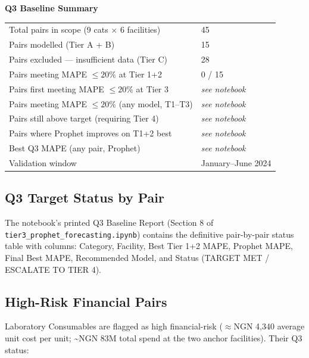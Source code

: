 \documentclass[12pt, a4paper]{article}
\begin{document}
\vspace{0.5em}

\begin{mdframed}[style=keybox]
\textbf{Q3 Baseline Summary}

\vspace{0.4em}
\begin{tabular}{@{}ll}
  Total pairs in scope (9 cats $\times$ 6 facilities)     & 45 \\
  Pairs modelled (Tier A + B)                              & 15 \\
  Pairs excluded --- insufficient data (Tier C)            & 28 \\[0.3em]
  Pairs meeting MAPE $\leq 20\%$ at Tier 1+2              & 0 / 15 \\
  Pairs first meeting MAPE $\leq 20\%$ at Tier 3          & \textit{see notebook} \\
  Pairs meeting MAPE $\leq 20\%$ (any model, T1--T3)      & \textit{see notebook} \\[0.3em]
  Pairs still above target (requiring Tier 4)              & \textit{see notebook} \\
  Pairs where Prophet improves on T1+2 best               & \textit{see notebook} \\
  Best Q3 MAPE (any pair, Prophet)                         & \textit{see notebook} \\
  Validation window                                        & January--June 2024 \\
\end{tabular}
\end{mdframed}

\subsection{Q3 Target Status by Pair}

The notebook's printed Q3 Baseline Report (Section 8 of
\texttt{tier3\_prophet\_forecasting.ipynb}) contains the definitive
pair-by-pair status table with columns: Category, Facility, Best Tier 1+2
MAPE, Prophet MAPE, Final Best MAPE, Recommended Model, and Status
(TARGET MET / ESCALATE TO TIER 4).

\subsection{High-Risk Financial Pairs}

Laboratory Consumables are flagged as high financial-risk ($\approx$NGN 4,340
average unit cost per unit; \textasciitilde NGN 83M total spend at the two
anchor facilities). Their Q3 status:
\end{document}
